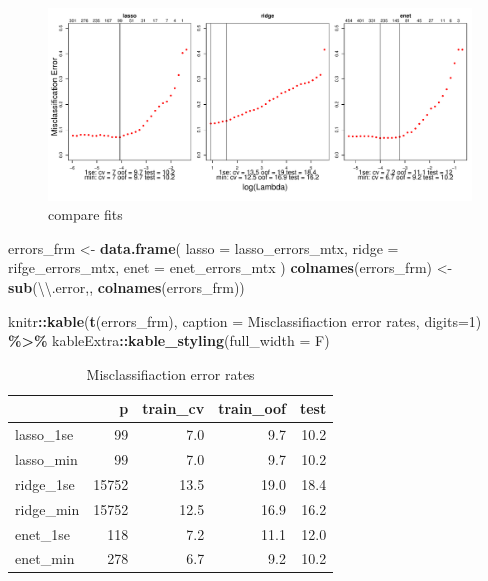 \documentclass[
]{book}
\newenvironment{Shaded}{\begin{snugshade}}{\end{snugshade}}
\newcommand{\CharTok}[1]{\textcolor[rgb]{0.31,0.60,0.02}{#1}}
\newcommand{\DataTypeTok}[1]{\textcolor[rgb]{0.13,0.29,0.53}{#1}}
\newcommand{\DecValTok}[1]{\textcolor[rgb]{0.00,0.00,0.81}{#1}}
\newcommand{\KeywordTok}[1]{\textcolor[rgb]{0.13,0.29,0.53}{\textbf{#1}}}
\newcommand{\NormalTok}[1]{#1}
\newcommand{\OperatorTok}[1]{\textcolor[rgb]{0.81,0.36,0.00}{\textbf{#1}}}
\newcommand{\StringTok}[1]{\textcolor[rgb]{0.31,0.60,0.02}{#1}}
\begin{document}
\begin{figure}
\centering
\includegraphics{Static/figures/lookFits-1.pdf}
\caption{\label{fig:lookFits}compare fits}
\end{figure}

\begin{Shaded}
\begin{Highlighting}[]
\NormalTok{errors\_frm <{-}}\StringTok{ }\KeywordTok{data.frame}\NormalTok{(}
  \DataTypeTok{lasso =}\NormalTok{ lasso\_errors\_mtx, }\DataTypeTok{ridge =}\NormalTok{ rifge\_errors\_mtx, }\DataTypeTok{enet =}\NormalTok{ enet\_errors\_mtx}
\NormalTok{)}
\KeywordTok{colnames}\NormalTok{(errors\_frm) <{-}}\StringTok{ }\KeywordTok{sub}\NormalTok{(}\StringTok{\textquotesingle{}}\CharTok{\textbackslash{}\textbackslash{}}\StringTok{.error\textquotesingle{}}\NormalTok{,}\StringTok{\textquotesingle{}\textquotesingle{}}\NormalTok{, }\KeywordTok{colnames}\NormalTok{(errors\_frm))}

\NormalTok{knitr}\OperatorTok{::}\KeywordTok{kable}\NormalTok{(}\KeywordTok{t}\NormalTok{(errors\_frm),}
 \DataTypeTok{caption =} \StringTok{\textquotesingle{}Misclassifiaction error rates\textquotesingle{}}\NormalTok{,}
 \DataTypeTok{digits=}\DecValTok{1}\NormalTok{) }\OperatorTok{\%>\%}\StringTok{ }
\StringTok{  }\NormalTok{kableExtra}\OperatorTok{::}\KeywordTok{kable\_styling}\NormalTok{(}\DataTypeTok{full\_width =}\NormalTok{ F)}
\end{Highlighting}
\end{Shaded}

\begin{table}

\caption{\label{tab:printErrors}Misclassifiaction error rates}
\centering
\begin{tabular}[t]{l|r|r|r|r}
\hline
  & p & train\_cv & train\_oof & test\\
\hline
lasso\_1se & 99 & 7.0 & 9.7 & 10.2\\
\hline
lasso\_min & 99 & 7.0 & 9.7 & 10.2\\
\hline
ridge\_1se & 15752 & 13.5 & 19.0 & 18.4\\
\hline
ridge\_min & 15752 & 12.5 & 16.9 & 16.2\\
\hline
enet\_1se & 118 & 7.2 & 11.1 & 12.0\\
\hline
enet\_min & 278 & 6.7 & 9.2 & 10.2\\
\hline
\end{tabular}
\end{table}
\end{document}
